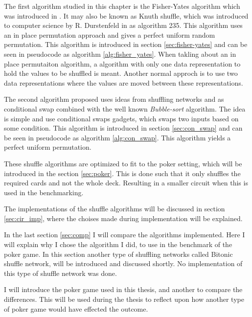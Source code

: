 \documentclass[twoside,11pt,openright]{report}
\begin{document}
The first algorithm studied in this chapter is the Fisher-Yates algorithm which was introduced in \cite{fisher_yates}. It may also be known as Knuth shuffle, which was introduced to computer science by R. Durstenfeld in \cite{durstenfeld} as algorithm 235. This algorithm uses an in place permutation approach and gives a perfect uniform random permutation. This algorithm is introduced in section \ref{sec:fisher-yates} and can be seen in pseudocode as algorithm \ref{alg:fisher_yates}. When takling about an in place permutaiton algorithm, a algorithm with only one data representation to hold the values to be shuffled is meant. Another normal approch is to use two data representations where the values are moved between these representations.

The second algorithm proposed uses ideas from shuffling networks and \cite{psi} as conditional swap combined with the well known \textit{Bubble-sort} algorithm. The idea is simple and use conditional swaps gadgets, which swaps two inputs based on some condition. This algorithm is introduced in section \ref{sec:con_swap} and can be seen in pseudocode as algorithm \ref{alg:con_swap}. This algorithm yields a perfect uniform permutation.

These shuffle algorithms are optimized to fit to the poker setting, which will be introduced in the section \ref{sec:poker}. This is done such that it only shuffles the required cards and not the whole deck. Resulting in a smaller circuit when this is used in the benchmarking.

The implementations of the shuffle algorithms will be discussed in section \ref{sec:cir_imp}, where the choises made during implementation will be explained.

In the last section \ref{sec:comp} I will compare the algorithms implemented. Here I will explain why I chose the algorithm I did, to use in the benchmark of the poker game. In this section another type of shuffling networks called Bitonic shuffle network, will be introduced and discussed shortly. No implementation of this type of shuffle network was done.

\bigskip

I will introduce the poker game used in this thesis, and another to compare the differences. This will be used during the thesis to reflect upon how another type of poker game would have effected the outcome.

\end{document}
